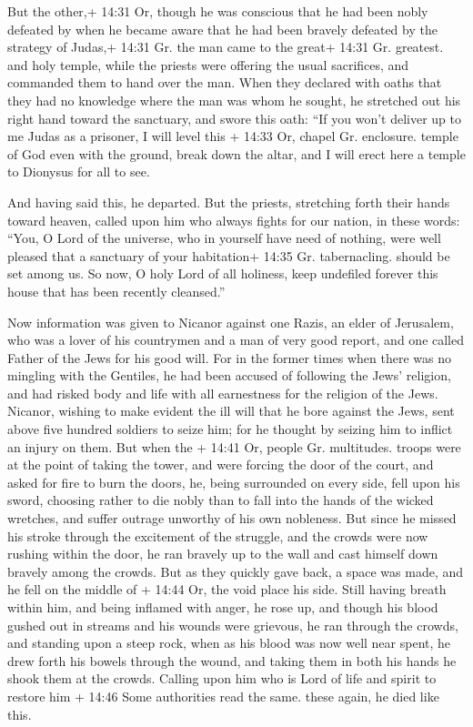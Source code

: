 But the other,+ 14:31 Or, though he was conscious that he
had been nobly defeated by when he became aware that he had been bravely
defeated by the strategy of Judas,+ 14:31 Gr. the man came to the great+
14:31 Gr. greatest. and holy temple, while the priests were offering the
usual sacrifices, and commanded them to hand over the man. 
When they declared with oaths that they had no knowledge where the man
was whom he sought,  he stretched out his right hand toward
the sanctuary, and swore this oath: ``If you won't deliver up to me
Judas as a prisoner, I will level this + 14:33 Or, chapel Gr. enclosure.
temple of God even with the ground, break down the altar, and I will
erect here a temple to Dionysus for all to see.

 And having said this, he departed. But the priests,
stretching forth their hands toward heaven, called upon him who always
fights for our nation, in these words:  ``You, O Lord of
the universe, who in yourself have need of nothing, were well pleased
that a sanctuary of your habitation+ 14:35 Gr. tabernacling. should be
set among us.  So now, O holy Lord of all holiness, keep
undefiled forever this house that has been recently cleansed.''

 Now information was given to Nicanor against one Razis, an
elder of Jerusalem, who was a lover of his countrymen and a man of very
good report, and one called Father of the Jews for his good will.
 For in the former times when there was no mingling with
the Gentiles, he had been accused of following the Jews' religion, and
had risked body and life with all earnestness for the religion of the
Jews.  Nicanor, wishing to make evident the ill will that
he bore against the Jews, sent above five hundred soldiers to seize him;
 for he thought by seizing him to inflict an injury on
them.  But when the + 14:41 Or, people Gr. multitudes.
troops were at the point of taking the tower, and were forcing the door
of the court, and asked for fire to burn the doors, he, being surrounded
on every side, fell upon his sword,  choosing rather to die
nobly than to fall into the hands of the wicked wretches, and suffer
outrage unworthy of his own nobleness.  But since he missed
his stroke through the excitement of the struggle, and the crowds were
now rushing within the door, he ran bravely up to the wall and cast
himself down bravely among the crowds.  But as they quickly
gave back, a space was made, and he fell on the middle of + 14:44 Or,
the void place his side.  Still having breath within him,
and being inflamed with anger, he rose up, and though his blood gushed
out in streams and his wounds were grievous, he ran through the crowds,
and standing upon a steep rock,  when as his blood was now
well near spent, he drew forth his bowels through the wound, and taking
them in both his hands he shook them at the crowds. Calling upon him who
is Lord of life and spirit to restore him + 14:46 Some authorities read
the same. these again, he died like this.

